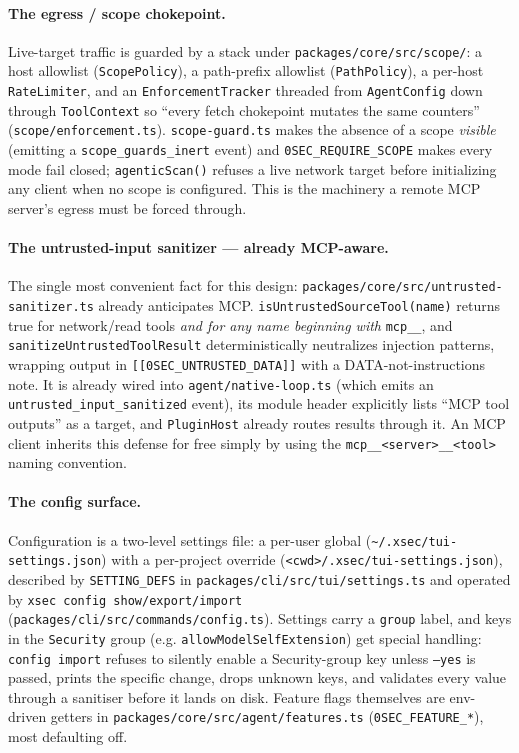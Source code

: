 \documentclass[11pt]{article}
\begin{document}
\paragraph{The egress / scope chokepoint.} Live-target traffic is guarded by a
stack under \texttt{packages/core/src/scope/}: a host allowlist
(\texttt{ScopePolicy}), a path-prefix allowlist (\texttt{PathPolicy}), a per-host
\texttt{RateLimiter}, and an \texttt{EnforcementTracker} threaded from
\texttt{AgentConfig} down through \texttt{ToolContext} so ``every fetch
chokepoint mutates the same counters''
(\texttt{scope/enforcement.ts}). \texttt{scope-guard.ts} makes the absence of a
scope \emph{visible} (emitting a \texttt{scope\_guards\_inert} event) and
\texttt{0SEC\_REQUIRE\_SCOPE} makes every mode fail closed;
\texttt{agenticScan()} refuses a live network target before initializing any
client when no scope is configured. This is the machinery a remote MCP server's
egress must be forced through.

\paragraph{The untrusted-input sanitizer --- already MCP-aware.} The single most
convenient fact for this design: \texttt{packages/core/src/untrusted-sanitizer.ts}
already anticipates MCP. \texttt{isUntrustedSourceTool(name)} returns true for
network/read tools \emph{and for any name beginning with} \texttt{mcp\_\_}, and
\texttt{sanitizeUntrustedToolResult} deterministically neutralizes injection
patterns, wrapping output in \texttt{[[0SEC\_UNTRUSTED\_DATA]]} with a
DATA-not-instructions note. It is already wired into
\texttt{agent/native-loop.ts} (which emits an \texttt{untrusted\_input\_sanitized}
event), its module header explicitly lists ``MCP tool outputs'' as a target, and
\texttt{PluginHost} already routes results through it. An MCP client inherits this
defense for free simply by using the \texttt{mcp\_\_<server>\_\_<tool>} naming
convention.

\paragraph{The config surface.} Configuration is a two-level settings file: a
per-user global (\texttt{\textasciitilde/.xsec/tui-settings.json}) with a
per-project override (\texttt{<cwd>/.xsec/tui-settings.json}), described by
\texttt{SETTING\_DEFS} in \texttt{packages/cli/src/tui/settings.ts} and operated
by \texttt{xsec config show/export/import}
(\texttt{packages/cli/src/commands/config.ts}). Settings carry a \texttt{group}
label, and keys in the \texttt{Security} group (e.g.
\texttt{allowModelSelfExtension}) get special handling: \texttt{config import}
refuses to silently enable a Security-group key unless \texttt{--yes} is passed,
prints the specific change, drops unknown keys, and validates every value
through a sanitiser before it lands on disk. Feature flags themselves are
env-driven getters in \texttt{packages/core/src/agent/features.ts}
(\texttt{0SEC\_FEATURE\_*}), most defaulting off.
\end{document}
